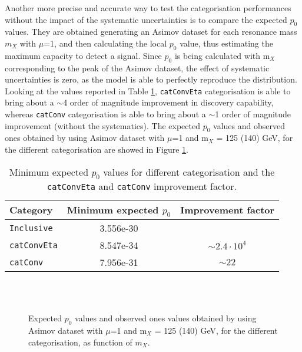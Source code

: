 \documentclass[a4paper, oneside, 11pt, openright]{book}
\begin{document}
 			Another more precise and accurate way to test the categorisation performances without the impact of the systematic uncertainties is to compare the expected  $p_0$ values. They are obtained generating an Asimov dataset for each resonance mass $m_X$ with $\mu$=1, and then calculating the local $p_0$ value, thus estimating the maximum capacity to detect a signal. Since $p_0$ is being calculated with m$_X$ corresponding to the peak of the Asimov dataset, the effect of systematic uncertainties is zero, as the model is able to perfectly reproduce the distribution. Looking at the values reported in Table \ref{tab:p0_imp}, \texttt{catConvEta} categorisation  is able to bring about a $\sim$4 order of magnitude improvement in discovery capability, whereas \texttt{catConv} categorisation is able to bring about a $\sim$1 order of magnitude improvement (without the systematics). The expected  $p_0$ values and observed ones obtained by using Asimov dataset with $\mu$=1 and m$_X$ = 125 (140) GeV, for the different categorisation are showed in Figure \ref{fig:p0_e_o}.
 			\begin{table}[tbp]
				\centering
				\begin{tabular}{lcc}
					\toprule[1.5pt]
					Category 			& Minimum expected $p_0$ 	& Improvement factor		\\
					\midrule
					\texttt{Inclusive}	& 3.556e-30					&							\\
					\texttt{catConvEta}	& 8.547e-34					& $\sim2.4\cdot 10^{4}$	\\
					\texttt{catConv}	& 7.956e-31					& $\sim22$ 	\\
					\bottomrule[1.5pt]
				\end{tabular}
 				\caption{Minimum expected $p_0$ values for different categorisation and the \texttt{catConvEta} and \texttt{catConv} improvement factor.}
 				\label{tab:p0_imp}
 			\end{table}
 			\begin{figure}
 				\centering
 				\\			
 				\\	
 				\caption{Expected $p_0$ values and observed ones values obtained by using Asimov dataset with $\mu$=1 and m$_X$ = 125 (140) GeV, for the different categorisation, as function of $m_X$.}
 				\label{fig:p0_e_o}
 			\end{figure}
 			
\end{document}
